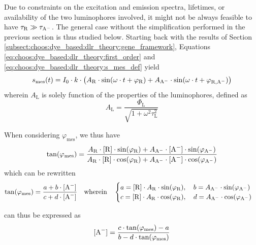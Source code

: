 Due to constraints on the excitation and emission spectra, lifetimes, or availability of the two luminophores involved, it might not be always feasible to have $\tau_\mathrm{R} \gg \tau_\mathrm{A^{\smash{-}}}$. The general case without the simplification performed in the previous section is thus studied below. Starting back with the results of Section \ref{subsect:choos:dye_based:dlr_theory:gene_framework}, Equations \ref{eq:choos:dye_based:dlr_theory:first_order} and \ref{eq:choos:dye_based:dlr_theory:s_mes_def} yield
\begin{equation}
	s_\text{mes}(t) = I_0\cdot k \cdot \left( A_\mathrm{R} \cdot \sin(\omega \cdot t + \varphi_\mathrm{R}) + A_\mathrm{A^{\smash{-}}} \cdot \sin(\omega \cdot t + \varphi_\mathrm{R, A^-}) \right)
\end{equation}
wherein $A_\mathrm{L}$ is solely function of the properties of the luminophores, defined as
\begin{equation}
	A_\mathrm{L} = \frac{\Phi_\mathrm{L}}{\sqrt{1+ \omega^2 \tau_\mathrm{L}^2}}
\end{equation}

When considering $\varphi_\text{mes}$, we thus have
\begin{equation}
	\tan(\varphi_\text{mes}) = \frac{
		A_\mathrm{R} \cdot \ce{[R]} \cdot \sin(\varphi_\mathrm{R}) + A_\mathrm{A\spminus} \cdot \ce{[A^-]} \cdot \sin(\varphi_\mathrm{A\spminus})
		}{
		A_\mathrm{R} \cdot \ce{[R]} \cdot \cos(\varphi_\mathrm{R}) + A_\mathrm{A\spminus} \cdot \ce{[A^-]} \cdot \cos(\varphi_\mathrm{A\spminus})
		}
\end{equation}
which can be rewritten
\begin{equation}
	\tan(\varphi_\text{mes}) = \frac{a + b \cdot \ce{[A^-]} }{c + d \cdot \ce{[A^-]} } \quad \text{wherein} \quad 
	\begin{cases}
		a = \ce{[R]} \cdot A_\mathrm{R} \cdot \sin(\varphi_\mathrm{R}), \quad b = A_\mathrm{A\spminus} \cdot \sin(\varphi_\mathrm{A\spminus}) \\
		c = \ce{[R]} \cdot A_\mathrm{R} \cdot \cos(\varphi_\mathrm{R}), \quad d = A_\mathrm{A\spminus} \cdot \cos(\varphi_\mathrm{A\spminus})
	\end{cases}
\end{equation}

\ce{[A^-]} can thus be expressed as
\begin{equation}\label{eq:gene_phi_mes}
	\ce{[A^-]} = \frac{c \cdot \tan( \varphi_\text{mes}) - a}{b - d \cdot \tan(\varphi_\text{mes})}
\end{equation}

